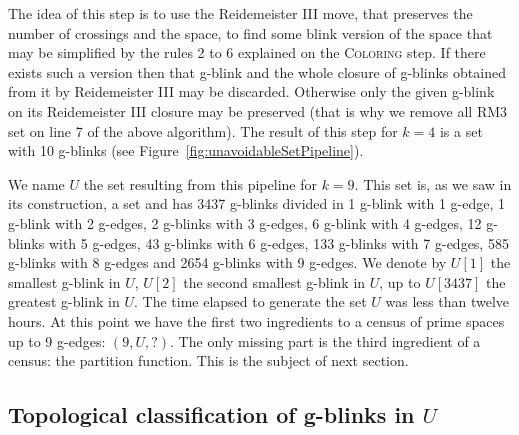 The idea of this step is to use the Reidemeister III move, that preserves
the number of crossings and the space, to find some blink version of the
space that may be simplified by the rules 2 to 6 explained on the
\textsc{Coloring} step. If there exists such a version then that
g-blink and the whole closure of g-blinks obtained from it by
Reidemeister III may be discarded. Otherwise only the given
g-blink on its Reidemeister III closure may be preserved (that
is why we remove all RM3 set on line 7 of the above algorithm).
The result of this step for $k = 4$ is a set with 10 g-blinks
(see Figure~\ref{fig:unavoidableSetPipeline}).

We name $U$ the set resulting from this pipeline for $k=9$. This set
is, as we saw in its construction, a \hbox{} set and has 3437 g-blinks
divided in 1 g-blink with 1 g-edge, 1 g-blink with 2 g-edges, 2 g-blinks
with 3 g-edges, 6 g-blink with 4 g-edges, 12 g-blinks with 5 g-edges, 43
g-blinks with 6 g-edges, 133 g-blinks with 7 g-edges, 585 g-blinks with
8 g-edges and 2654 g-blinks with 9 g-edges. We denote by $U[1]$ the
smallest g-blink in $U$, $U[2]$ the second smallest g-blink in $U$,
up to $U[3437]$ the greatest g-blink in $U$. The time elapsed to
generate the set $U$ was less than twelve hours. At this point we have
the first two ingredients to a census of prime spaces up to 9 g-edges:
$(9, U, ?)$. The only missing part is the third ingredient of a census:
the partition function. This is the subject of next section.

\subsection{Topological classification of g-blinks in $U$}
\label{sec:topologicalClassificationOfU}

